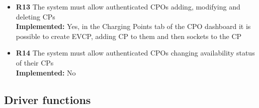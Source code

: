 \begin{itemize}
      \item        \textbf{R13} The system must allow authenticated CPOs adding, modifying and deleting CPs                                                                              \\
            \textbf{Implemented:} Yes, in the Charging Points tab of the CPO dashboard it is possible to create EVCP, adding CP to them and then sockets to the CP
      \item        \textbf{R14} The system must allow authenticated CPOs changing availability status of their CPs                                                                       \\
            \textbf{Implemented:} No
\end{itemize}

\subsection{Driver functions}

